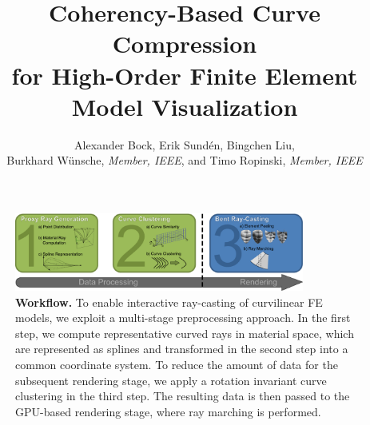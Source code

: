 \documentclass[journal]{vgtc}                %
\title{Coherency-Based Curve Compression\\ for High-Order Finite Element Model Visualization}
\author{Alexander Bock, Erik Sund\'en, Bingchen Liu,\\Burkhard W{\"u}nsche, \textit{Member, IEEE}, and Timo Ropinski, \textit{Member, IEEE}}
\begin{document}
%
%
\label{sec:introduction}
%
\maketitle
%
\begin{figure}[t]
    \centering
    \includegraphics[width=0.85\textwidth]{figures/workflow-new.pdf}
    \caption{\textbf{Workflow.} To enable interactive ray-casting of curvilinear FE models, we exploit a multi-stage preprocessing approach. In the first step, we compute representative curved rays in material space, which are represented as splines and transformed in the second step into a common coordinate system. To reduce the amount of data for the subsequent rendering stage, we apply a rotation invariant curve clustering in the third step. The resulting data is then passed to the GPU-based rendering stage, where ray marching is performed.}
    \label{fig:workflow}
\end{figure}
%
%
%
\end{document}
